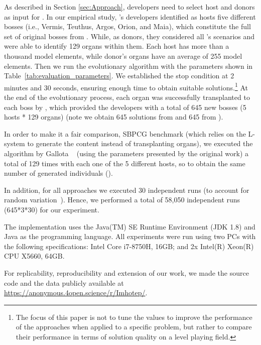 As described in Section \ref{sec:Approach}, developers need to select host and donors as input for \ApproachName. In our empirical study,  \CaseStudy{}'s developers identified as hosts five different bosses (i.e., Vermis, Teuthus, Argos, Orion, and Maia), which constitute the full set of original bosses from \CaseStudy{}. While, as donors, they considered all \CaseStudy{}'s scenarios and were able to identify 129 organs within them. 
Each host has more than a thousand model elements, while donor's organs have an average of 255 model elements.
Then we run the \ApproachName evolutionary algorithm  with the parameters shown in Table~\ref{tab:evaluation_parameters}. We established the stop condition at 2 minutes and 30 seconds, ensuring enough time to obtain suitable solutions.\footnote{The focus of this paper is not to tune the values to improve the performance of the approaches when applied to a specific problem, but rather to compare their performance in terms of solution quality on a level playing field.} At the end of the evolutionary process, each organ was successfully transplanted to each boss by \ApproachName{}, which provided the developers with a total of 645 new bosses (5 hosts * 129 organs) (note we obtain 645 solutions from \simhotep{} and 645  from \timhotep{}). 

In order to make it a fair comparison, SBPCG benchmark (which relies on the L-system to generate the content instead of transplanting organs), we executed the algorithm by Gallota \etal~\cite{gallotta2022evolving} (using the parameters presented by the original work) a total of 129 times with each one of the 5 different hosts, so to obtain the same number of generated individuals ().

In addition, for all approaches we executed 30 independent runs (to account for random variation~\cite{arcuri2013parameter}).  Hence, we performed a total of 58,050 independent runs (645*3*30) for our experiment.

The implementation uses the Java(TM) SE Runtime Environment (JDK 1.8) and Java as the programming language. All experiments were run using two PCs with the following specifications: Intel Core i7-8750H, 16GB; and  2x Intel(R) Xeon(R) CPU X5660, 64GB.

For replicability, reproducibility and extension of our work, we made the source code and the data publicly available at \url{https://anonymous.4open.science/r/Imhotep/}.

